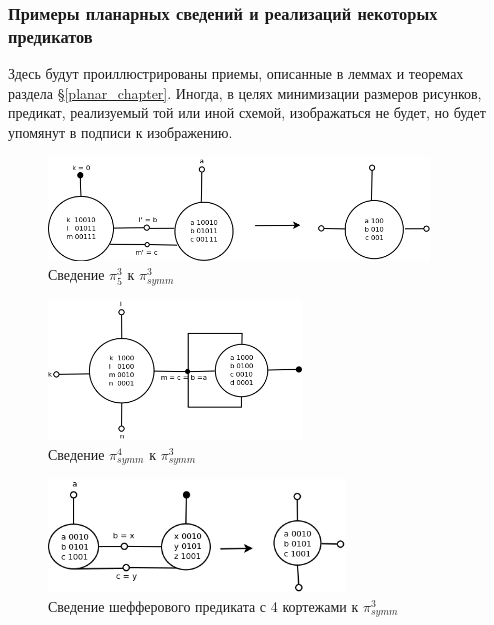 \documentclass[12pt]{article}
\begin{document}
\clearpage
\subsubsection{Примеры планарных сведений и реализаций некоторых предикатов}
Здесь будут проиллюстрированы приемы, описанные в леммах и теоремах раздела \S \ref{planar_chapter}. 
Иногда, в целях минимизации размеров рисунков, предикат, реализуемый той или иной схемой, изображаться не будет, 
но будет упомянут в подписи к изображению.

\begin{figure}[htb]
\centering
\includegraphics[width=0.9\textwidth]{3_2to3.png}
\caption{Сведение $\pi_5^3$ к $\pi_{symm}^3$ }
\label{fig:3_2to3}
\end{figure}

\begin{figure}[htb]
 \centering
\includegraphics[width=0.6\textwidth]{4to3.png}
\caption{Сведение $\pi_{symm}^4$ к $\pi_{symm}^3$ }
\label{fig:4to3}
\end{figure}

\begin{figure}[htb]
 \centering
\includegraphics[width=0.7\textwidth]{sch4.png}
\caption{Сведение шефферового предиката с 4 кортежами к $\pi_{symm}^3$ }
\label{fig:sheff4tosheff3}
\end{figure}
\end{document}

